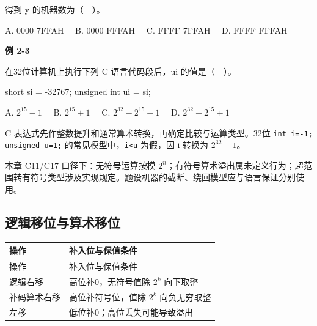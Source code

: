 得到 y 的机器数为（　）。

A. 0000 7FFAH　 B. 0000 FFFAH　 C. FFFF 7FFAH　 D. FFFF FFFAH

\par\medskip{}\noindent\hypertarget{CO02-E03}{}\label{CO02-E03}\textbf{例 2-3}\par\nobreak\smallskip

在32位计算机上执行下列 C 语言代码段后，ui 的值是（　）。

\par\smallskip\noindent\begin{minipage}{\linewidth}
\begin{codeblock}[language={C}]
short si = -32767;
unsigned int ui = si;
\end{codeblock}
\end{minipage}\par\smallskip

A. \(2^{15}-1\)　 B. \(2^{15}+1\)　 C. \(2^{32}-2^{15}-1\)　 D. \(2^{32}-2^{15}+1\)

C 表达式先作整数提升和通常算术转换，再确定比较与运算类型。32位 \texttt{int i=\allowbreak{}-1;\allowbreak{} unsigned u=\allowbreak{}1;\allowbreak{}} 的常见模型中，\texttt{i<\allowbreak{}u} 为假，因 i 转换为 \(2^{32}-1\)。

本章 C11/C17 口径下：无符号运算按模 \(2^n\)；有符号算术溢出属未定义行为；超范围转有符号类型涉及实现规定。题设机器的截断、绕回模型应与语言保证分别使用。

\subsection{逻辑移位与算术移位}\label{CO02-shift}

\par\smallskip
{\fontsize{9.3}{12}\selectfont\setlength{\tabcolsep}{2.5pt}\setlength{\LTleft}{0pt}\setlength{\LTright}{0pt}
\begin{longtable}{@{}>{\raggedright\arraybackslash}p{}>{\raggedright\arraybackslash}p{}@{}}
\toprule
操作 & 补入位与保值条件 \\

\midrule\endfirsthead\toprule
操作 & 补入位与保值条件 \\

\midrule\endhead\bottomrule\endfoot
逻辑右移 & 高位补0，无符号值除 \(2^k\) 向下取整 \\

补码算术右移 & 高位补符号位，值除 \(2^k\) 向负无穷取整 \\

左移 & 低位补0；高位丢失可能导致溢出 \\

\end{longtable}}
\par\smallskip

